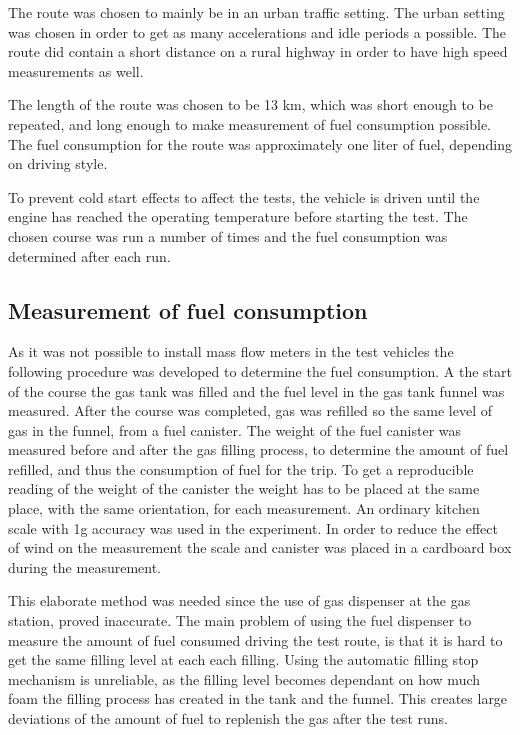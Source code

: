 \documentclass[conference]{IEEEtran}
\begin{document}
The route was chosen to mainly be in an urban traffic setting. The urban setting was chosen in order to get as many accelerations and idle periods a possible. The route did contain a short distance on a rural highway in order to have high speed measurements as well.

The length of the route was chosen to be 13 km, which was short enough to be repeated, and long enough to make measurement of fuel consumption possible. The fuel consumption for the route was approximately one liter of fuel, depending on driving style.

To prevent cold start effects to affect the tests, the vehicle is driven until the engine has reached the operating temperature before starting the test. The chosen course was run a number of times and the fuel consumption was determined after each run.

\subsection{Measurement of fuel consumption}

As it was not possible to install mass flow meters in the test vehicles the following procedure was developed to determine the fuel consumption. A the start of the course the gas tank was filled and  the fuel level in the gas tank funnel was measured. After the course was completed, gas was refilled so the same level of gas in the funnel, from a fuel canister. The weight of the fuel canister was measured before and after the gas filling process, to determine the amount of fuel refilled, and thus the consumption of fuel for the trip. To get a reproducible reading of the weight of the canister the weight has to be placed at the same place, with the same orientation, for each measurement. An ordinary kitchen scale with 1g accuracy was used in the experiment. In order to reduce the effect of wind on the measurement the scale and canister was placed in a cardboard box during the measurement.

This elaborate method was needed since the use of gas dispenser at the gas station, proved inaccurate. The main problem of using the fuel dispenser to measure the amount of fuel consumed driving the test route, is that it is hard to get the same filling level at each each filling. Using the automatic filling stop mechanism is unreliable, as the filling level becomes dependant on how much foam the filling process has created in the tank and the funnel. This creates large deviations of the amount of fuel to replenish the gas after the test runs. 
\end{document}
